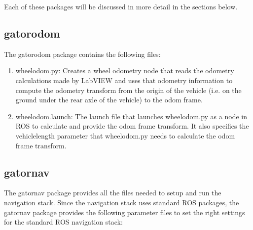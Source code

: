 Each of these packages will be discussed in more detail in the sections below.

\subsection{gator\textunderscore odom}

The gator\textunderscore odom package contains the following files:

\begin{enumerate}
\item wheel\textunderscore odom.py: Creates a wheel odometry node that reads the odometry calculations made by LabVIEW and uses that odometry information to compute the odometry transform from the origin of the vehicle (i.e. on the ground under the rear axle of the vehicle) to the odom frame.
\item wheel\textunderscore odom.launch: The launch file that launches wheel\textunderscore odom.py as a node in ROS to calculate and provide the odom frame transform. It also specifies the vehicle\textunderscore length parameter that wheel\textunderscore odom.py needs to calculate the odom frame transform.
\end{enumerate}

\subsection{gator\textunderscore nav}

The gator\textunderscore nav package provides all the files needed to setup and run the navigation stack. Since the navigation stack uses standard ROS packages, the gator\textunderscore nav package provides the following parameter files to set the right settings for the standard ROS navigation stack:

